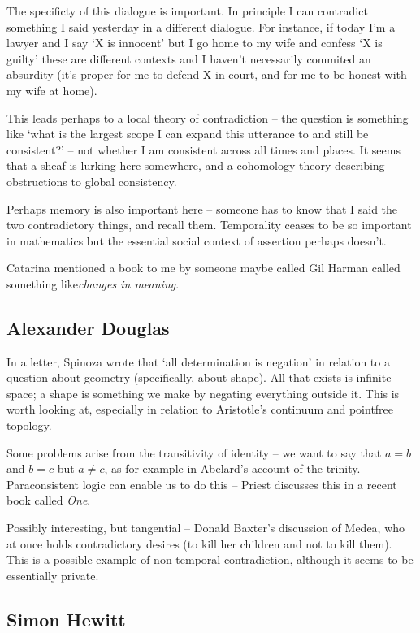 \documentclass[oneside,english]{article}
\theoremstyle{plain}
\theoremstyle{definition}
\theoremstyle{definition}
\begin{document}
The specificty of this dialogue is important. In principle I can contradict something I said yesterday in a different dialogue. For instance, if today I'm a lawyer and I say `X is innocent' but I go home to my wife and confess `X is guilty' these are different contexts and I haven't necessarily commited an absurdity (it's proper for me to defend X in court, and for me to be honest with my wife at home).

This leads perhaps to a local theory of contradiction -- the question is something like `what is the largest scope I can expand this utterance to and still be consistent?' -- not whether I am consistent across all times and places. It seems that a sheaf is lurking here somewhere, and a cohomology theory describing obstructions to global consistency.

Perhaps memory is also important here -- someone has to know that I said the two contradictory things, and recall them. Temporality ceases to be so important in mathematics but the essential social context of assertion perhaps doesn't.

Catarina mentioned a book to me by someone maybe called Gil Harman called something like\emph{changes in meaning}.
	
\subsection{Alexander Douglas}

In a letter, Spinoza wrote that `all determination is negation' in relation to a question about geometry (specifically, about shape). All that exists is infinite space; a shape is something we make by negating everything outside it. This is worth looking at, especially in relation to Aristotle's continuum and pointfree topology.

Some problems arise from the transitivity of identity -- we want to say that $a=b$ and $b=c$ but $a\ne c$, as for example in Abelard's account of the trinity. Paraconsistent logic can enable us to do this -- Priest discusses this in a recent book called \emph{One}.

Possibly interesting, but tangential -- Donald Baxter's discussion of Medea, who at once holds contradictory desires (to kill her children and not to kill them). This is a possible example of non-temporal contradiction, although it seems to be essentially private.

\subsection{Simon Hewitt}
\end{document}
